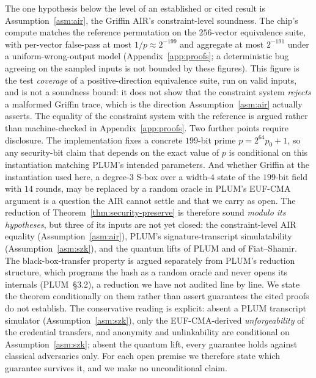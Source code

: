 The one hypothesis below the level of an established or cited result is Assumption~\ref{asm:air}, the Griffin AIR's constraint-level soundness. The chip's compute matches the reference permutation on the $256$-vector equivalence suite, with per-vector false-pass at most $1/p\approx 2^{-199}$ and aggregate at most $2^{-191}$ under a uniform-wrong-output model (Appendix~\ref{app:proofs}; a deterministic bug agreeing on the sampled inputs is not bounded by these figures). This figure is the test \emph{coverage} of a positive-direction equivalence suite, run on valid inputs, and is not a soundness bound: it does not show that the constraint system \emph{rejects} a malformed Griffin trace, which is the direction Assumption~\ref{asm:air} actually asserts. The equality of the constraint system with the reference is argued rather than machine-checked in Appendix~\ref{app:proofs}. Two further points require disclosure. The implementation fixes a concrete $199$-bit prime $p=2^{64}p_0+1$, so any security-bit claim that depends on the exact value of $p$ is conditional on this instantiation matching PLUM's intended parameters. And whether Griffin at the instantiation used here, a degree-$3$ S-box over a width-$4$ state of the $199$-bit field with $14$ rounds, may be replaced by a random oracle in PLUM's EUF-CMA argument is a question the AIR cannot settle and that we carry as open. The reduction of Theorem~\ref{thm:security-preserve} is therefore sound \emph{modulo its hypotheses}, but three of its inputs are not yet closed: the constraint-level AIR equality (Assumption~\ref{asm:air}), PLUM's signature-transcript simulatability (Assumption~\ref{asm:szk}), and the quantum lifts of PLUM and of Fiat--Shamir. The black-box-transfer property is argued separately from PLUM's reduction structure, which programs the hash as a random oracle and never opens its internals (PLUM~\S3.2), a reduction we have not audited line by line. We state the theorem conditionally on them rather than assert guarantees the cited proofs do not establish. The conservative reading is explicit: absent a PLUM transcript simulator (Assumption~\ref{asm:szk}), only the EUF-CMA-derived \emph{unforgeability} of the credential transfers, and anonymity and unlinkability are conditional on Assumption~\ref{asm:szk}; absent the quantum lift, every guarantee holds against classical adversaries only. For each open premise we therefore state which guarantee survives it, and we make no unconditional claim.

